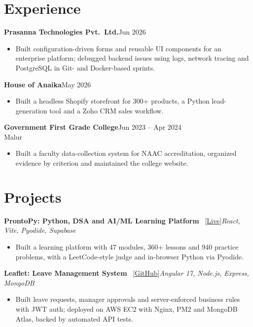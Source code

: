 \documentclass[a4paper,10pt]{article}
\newenvironment{bullets}{\begin{itemize}[leftmargin=1.2em, itemsep=1pt, topsep=1.5pt, partopsep=0pt, parsep=0pt]}{\end{itemize}\vspace{1pt}}
\newcommand{\job}[4]{\textbf{#1}\hfill{\small #2}\\[-1pt]\hspace*{0.8em}{\small\itshape #3}\hfill{\small #4}\vspace{1pt}}
\newcommand{\project}[3]{\textbf{#1} \ {\small [#3]}\hfill{\small\itshape #2}\vspace{1pt}}
\begin{document}
\section*{Experience}
\job{Prasanna Technologies Pvt.\ Ltd.}{Jun 2026}{Software Developer Intern}{}
\begin{bullets}
  \item Built configuration-driven forms and reusable UI components for an enterprise platform; debugged backend issues using logs, network tracing and PostgreSQL in Git- and Docker-based sprints.
\end{bullets}

\job{House of Anaika}{May 2026}{Freelance Software Developer}{}
\begin{bullets}
  \item Built a headless Shopify storefront for 300+ products, a Python lead-generation tool and a Zoho CRM sales workflow.
\end{bullets}

\job{Government First Grade College}{Jun 2023 -- Apr 2024}{IT Head (Freelance)}{Malur}
\begin{bullets}
  \item Built a faculty data-collection system for NAAC accreditation, organized evidence by criterion and maintained the college website.
\end{bullets}

\section*{Projects}
\project{ProntoPy: Python, DSA and AI/ML Learning Platform}{React, Vite, Pyodide, Supabase}{\href{https://python-dsa-sigma.vercel.app/}{Live}}
\begin{bullets}
  \item Built a learning platform with 47 modules, 360+ lessons and 940 practice problems, with a LeetCode-style judge and in-browser Python via Pyodide.
\end{bullets}

\project{Leaflet: Leave Management System}{Angular 17, Node.js, Express, MongoDB}{\href{https://github.com/pankqx/leavemgm}{GitHub}}
\begin{bullets}
  \item Built leave requests, manager approvals and server-enforced business rules with JWT auth; deployed on AWS EC2 with Nginx, PM2 and MongoDB Atlas, backed by automated API tests.
\end{bullets}
\end{document}
